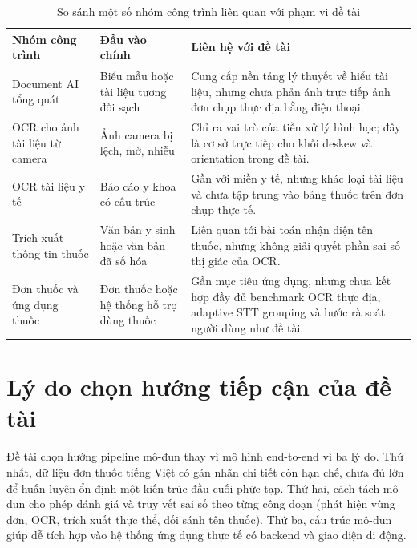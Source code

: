\documentclass[12pt,a4paper]{report}
\renewcommand{\arraystretch}{1.25}
\begin{document}
\begin{table}[htbp]
\centering
\caption{So sánh một số nhóm công trình liên quan với phạm vi đề tài}
\label{tab:related-work-gap}
{\renewcommand{\arraystretch}{1.3}
\begin{tabularx}{\textwidth}{|L{3.2cm}|L{2.8cm}|Y|}
\hline
\textbf{Nhóm công trình} & \textbf{Đầu vào chính} & \textbf{Liên hệ với đề tài} \\
\hline
Document AI tổng quát \cite{layoutlm,layoutlmv3,donut} & Biểu mẫu hoặc tài liệu tương đối sạch & Cung cấp nền tảng lý thuyết về hiểu tài liệu, nhưng chưa phản ánh trực tiếp ảnh đơn chụp thực địa bằng điện thoại. \\
\hline
OCR cho ảnh tài liệu từ camera \cite{camera_doc_mosaic,camera_kanji_ocr,camera_binarization} & Ảnh camera bị lệch, mờ, nhiễu & Chỉ ra vai trò của tiền xử lý hình học; đây là cơ sở trực tiếp cho khối deskew và orientation trong đề tài. \\
\hline
OCR tài liệu y tế \cite{medical_report_ocr} & Báo cáo y khoa có cấu trúc & Gần với miền y tế, nhưng khác loại tài liệu và chưa tập trung vào bảng thuốc trên đơn chụp thực tế. \\
\hline
Trích xuất thông tin thuốc \cite{medication_ie} & Văn bản y sinh hoặc văn bản đã số hóa & Liên quan tới bài toán nhận diện tên thuốc, nhưng không giải quyết phần sai số thị giác của OCR. \\
\hline
Đơn thuốc và ứng dụng thuốc \cite{prescription_ocr_tesseract,who_adherence,osterberg2005} & Đơn thuốc hoặc hệ thống hỗ trợ dùng thuốc & Gần mục tiêu ứng dụng, nhưng chưa kết hợp đầy đủ benchmark OCR thực địa, adaptive STT grouping và bước rà soát người dùng như đề tài. \\
\hline
\end{tabularx}}
\end{table}

\section{Lý do chọn hướng tiếp cận của đề tài}

Đề tài chọn hướng pipeline mô-đun thay vì mô hình end-to-end vì ba lý do. Thứ nhất, dữ liệu đơn thuốc tiếng Việt có gán nhãn chi tiết còn hạn chế, chưa đủ lớn để huấn luyện ổn định một kiến trúc đầu-cuối phức tạp. Thứ hai, cách tách mô-đun cho phép đánh giá và truy vết sai số theo từng công đoạn (phát hiện vùng đơn, OCR, trích xuất thực thể, đối sánh tên thuốc). Thứ ba, cấu trúc mô-đun giúp dễ tích hợp vào hệ thống ứng dụng thực tế có backend và giao diện di động.
\end{document}
